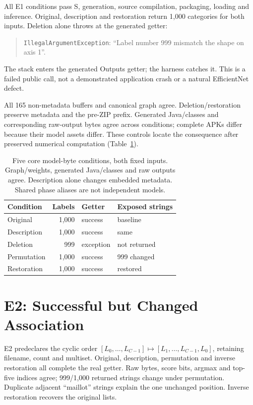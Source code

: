 \documentclass[10pt,conference]{IEEEtran}
\newcommand{\code}[1]{\texttt{#1}}
\begin{document}
All E1 conditions pass S, generation, source compilation, packaging, loading and inference. Original, description and restoration return 1,000 categories for both inputs. Deletion alone throws at the generated getter:
\begin{quote}\small\raggedright
\code{IllegalArgumentException}: ``Label number 999 mismatch the shape on axis 1''.
\end{quote}
The stack enters the generated Outputs getter; the harness catches it. This is a failed public call, not a demonstrated application crash or a natural EfficientNet defect.

All 165 non-metadata buffers and canonical graph agree. Deletion/restoration preserve metadata and the pre-ZIP prefix. Generated Java/classes and corresponding raw-output bytes agree across conditions; complete APKs differ because their model assets differ. These controls locate the consequence after preserved numerical computation (Table~\ref{tab:core}).

\begin{table}[t]
\caption{Five core model-byte conditions, both fixed inputs. Graph/weights, generated Java/classes and raw outputs agree. Description alone changes embedded metadata. Shared phase aliases are not independent models.}
\label{tab:core}
\centering\footnotesize
\begin{tabular}{@{}lrll@{}}
\toprule
Condition & Labels & Getter & Exposed strings\\
\midrule
Original & 1,000 & success & baseline\\
Description & 1,000 & success & same\\
Deletion & 999 & exception & not returned\\
Permutation & 1,000 & success & 999 changed\\
Restoration & 1,000 & success & restored\\
\bottomrule
\end{tabular}
\end{table}

\section{E2: Successful but Changed Association}
\label{sec:e2}
E2 predeclares the cyclic order $[L_0,\ldots,L_{C-1}]\mapsto[L_1,\ldots,L_{C-1},L_0]$, retaining filename, count and multiset. Original, description, permutation and inverse restoration all complete the real getter. Raw bytes, score bits, argmax and top-five indices agree; 999/1,000 returned strings change under permutation. Duplicate adjacent ``maillot'' strings explain the one unchanged position. Inverse restoration recovers the original lists.
\end{document}
